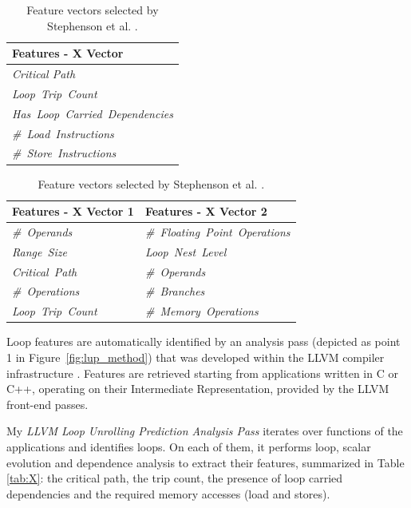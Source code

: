 \documentclass[]{usiinfthesis}
\begin{document}
%
%
\begin{table}[h]
  \centering

  \small\addtolength{\tabcolsep}{-3pt}
  \vspace{1em}
  \begin{tabular}{| l |} 
 \hline    
 \textbf{Features - X Vector}  \\ \hline
    \emph{Critical Path}      \\ \hline
   \emph{ Loop\ Trip\ Count} \\ \hline
   \emph{ Has\ Loop\ Carried\ Dependencies}     \\ \hline
   \emph{ \#\ Load\ Instructions}     \\ \hline
   \emph{ \#\ Store\ Instructions}      \\ \hline
  \end{tabular} 
    \caption{Features extracted by LLVM LU Analysis Pass.}
      \label{tab:X}
  
  
     \vspace{2em}
  

  \begin{tabular}{| l | l |} 
 \hline    
 \textbf{Features - X Vector 1} & \textbf{Features - X Vector 2}  \\ \hline
  \emph{\#\ Operands}        &\emph{\#\ Floating\ Point\ Operations}        \\ \hline
  \emph{Range\ Size}     &\emph{Loop\ Nest\ Level}   \\ \hline
    \emph{Critical\ Path}   &\emph{\#\ Operands}  \\ \hline
  \emph{\#\ Operations}      &\emph{\#\ Branches}   \\ \hline
  \emph{Loop\ Trip\ Count}&\emph{\#\ Memory\ Operations}   \\ \hline
  \end{tabular}
    \caption{Feature vectors selected by Stephenson et al. \cite{StephensonApr05}.}
      \label{tab:St_X1_X2}
\end{table}

Loop features are automatically identified by an analysis pass (depicted as 
point 1 in Figure~\ref{fig:lup_method}) that was developed within the LLVM 
compiler infrastructure \cite{LattnerMar04}. Features are retrieved starting from
applications written in C or C++, operating on their Intermediate
Representation, provided by the LLVM front-end passes.\par  
My \textit{LLVM Loop Unrolling Prediction Analysis Pass} iterates over functions
of the applications and identifies loops. On each of them, it performs
loop, scalar evolution and dependence analysis to extract their
features, summarized in Table \ref{tab:X}: the critical path, the trip
count, the presence of loop carried dependencies and the required
memory accesses (load and stores).\par
\end{document}
